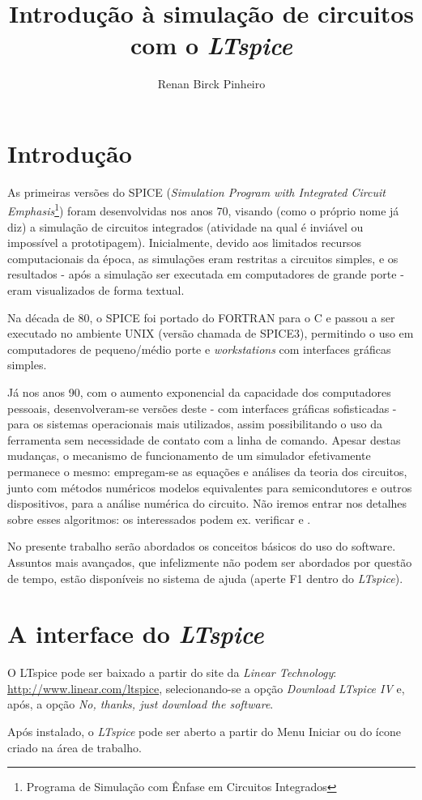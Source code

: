 \documentclass[]{report}
\title{\textbf{Introdução à simulação de circuitos com o \textit{LTspice}}}
\author{Renan Birck Pinheiro}
\begin{document}


\chapter{Introdução}
As primeiras versões do SPICE (\textit{Simulation Program with Integrated Circuit Emphasis}\footnote{Programa de Simulação com Ênfase em Circuitos Integrados}) foram desenvolvidas nos anos 70, visando (como o próprio nome já diz) a simulação de circuitos integrados (atividade na qual é inviável ou impossível a prototipagem). Inicialmente, devido aos limitados recursos computacionais da época, as simulações eram restritas a circuitos simples, e os resultados - após a simulação ser executada em computadores de grande porte - eram visualizados de forma textual.

Na década de 80, o SPICE foi portado do FORTRAN para o C e passou a ser executado no ambiente UNIX (versão chamada de SPICE3), permitindo o uso em computadores de pequeno/médio porte e \textit{workstations} com interfaces gráficas simples. 

Já nos anos 90, com o aumento exponencial da capacidade dos computadores pessoais, desenvolveram-se versões deste - com interfaces gráficas sofisticadas - para os sistemas operacionais mais utilizados, assim possibilitando o uso da ferramenta sem necessidade de contato com a linha de comando. Apesar destas mudanças, o mecanismo de funcionamento de um simulador  efetivamente permanece o mesmo: empregam-se as equações e análises da teoria dos circuitos, junto com métodos numéricos modelos equivalentes para semicondutores e outros dispositivos, para a análise numérica do circuito. Não iremos entrar nos detalhes sobre esses algoritmos: os interessados podem ex. verificar \cite{nagel} e \cite{chung}.

No presente trabalho serão abordados os conceitos básicos do uso do software. Assuntos mais avançados, que infelizmente não podem ser abordados por questão de tempo, estão disponíveis no sistema de ajuda (aperte F1 dentro do \textit{LTspice}).
\chapter{A interface do \textit{LTspice}}
O LTspice pode ser baixado a partir do site da \textit{Linear Technology}: \url{http://www.linear.com/ltspice}, selecionando-se a opção \textit{Download LTspice IV} e, após, a opção \textit{No, thanks, just download the software}. 

Após instalado, o \textit{LTspice} pode ser aberto a partir do Menu Iniciar ou do ícone criado na área de trabalho. 
\end{document}
